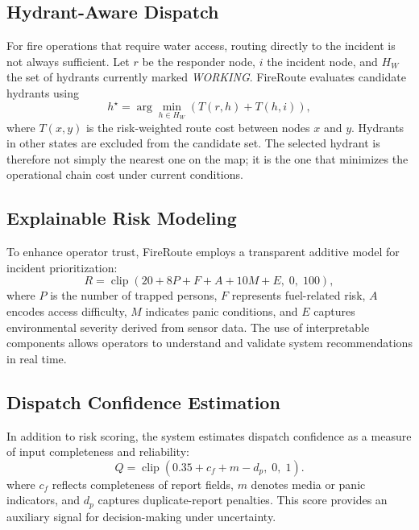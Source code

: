 \subsection{Hydrant-Aware Dispatch}
For fire operations that require water access, routing directly to the incident is not always sufficient. Let $r$ be the responder node, $i$ the incident node, and $H_W$ the set of hydrants currently marked \textit{WORKING}. FireRoute evaluates candidate hydrants using
\begin{equation}
h^\star=\arg\min_{h \in H_W} \left(T(r,h)+T(h,i)\right),
\end{equation}
where $T(x,y)$ is the risk-weighted route cost between nodes $x$ and $y$. Hydrants in other states are excluded from the candidate set. The selected hydrant is therefore not simply the nearest one on the map; it is the one that minimizes the operational chain cost under current conditions.

\subsection{Explainable Risk Modeling}

To enhance operator trust, FireRoute employs a transparent additive model for incident prioritization:
\begin{equation}
R = \operatorname{clip}(20 + 8P + F + A + 10M + E,\; 0,\; 100),
\end{equation}
where $P$ is the number of trapped persons, $F$ represents fuel-related risk, $A$ encodes access difficulty, $M$ indicates panic conditions, and $E$ captures environmental severity derived from sensor data. The use of interpretable components allows operators to understand and validate system recommendations in real time.

\subsection{Dispatch Confidence Estimation}

In addition to risk scoring, the system estimates dispatch confidence as a measure of input completeness and reliability:
\begin{equation}
Q = \operatorname{clip}(0.35 + c_f + m - d_p,\; 0,\; 1).
\end{equation}
where $c_f$ reflects completeness of report fields, $m$ denotes media or panic indicators, and $d_p$ captures duplicate-report penalties. This score provides an auxiliary signal for decision-making under uncertainty.


